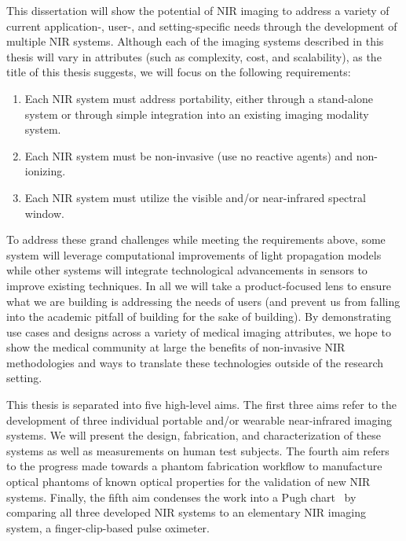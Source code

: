 This dissertation will show the potential of \ac{NIR} imaging to address a variety of current application-, user-, and setting-specific needs through the development of multiple \ac{NIR} systems. Although each of the imaging systems described in this thesis will vary in attributes (such as complexity, cost, and scalability), as the title of this thesis suggests, we will focus on the following requirements:
\begin{enumerate}
  \item Each \ac{NIR} system must address portability, either through a stand-alone system or through simple integration into an existing imaging modality system. 
  \item Each \ac{NIR} system must be non-invasive (use no reactive agents) and non-ionizing.
  \item Each \ac{NIR} system must utilize the visible and/or near-infrared spectral window.
\end{enumerate}

To address these grand challenges while meeting the requirements above, some system will leverage computational improvements of light propagation models while other systems will integrate technological advancements in sensors to improve existing techniques. In all we will take a product-focused lens to ensure what we are building is addressing the needs of users (and prevent us from falling into the academic pitfall of building for the sake of building). By demonstrating use cases and designs across a variety of medical imaging attributes, we hope to show the medical community at large the benefits of non-invasive \ac{NIR} methodologies and ways to translate these technologies outside of the research setting. 

This thesis is separated into five high-level aims. The first three aims refer to the development of three individual portable and/or wearable near-infrared imaging systems. We will present the design, fabrication, and characterization of these systems as well as measurements on human test subjects. The fourth aim refers to the progress made towards a phantom fabrication workflow to manufacture optical phantoms of known optical properties for the validation of new \ac{NIR} systems. Finally, the fifth aim condenses the work into a Pugh chart~\cite{Pugh1981} by comparing all three developed \ac{NIR} systems to an elementary \ac{NIR} imaging system, a finger-clip-based pulse oximeter. 

